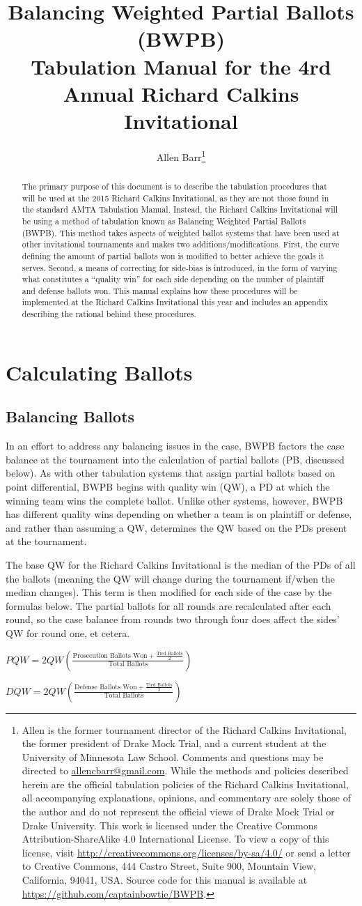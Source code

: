 \documentclass{article}
\title{\textbf{Balancing Weighted Partial Ballots (BWPB)}\\ \large  Tabulation Manual for the 4rd Annual Richard Calkins Invitational}
\author{Allen Barr\footnote{Allen is the former tournament director of the Richard Calkins Invitational, the former president of Drake Mock Trial, and a current student at the University of Minnesota Law School.  Comments and questions may be directed to \href{mailto:allencbarr@gmail.com}{allencbarr@gmail.com}.  While the methods and policies described herein are the official tabulation policies of the Richard Calkins Invitational, all accompanying explanations, opinions, and commentary are solely those of the author and do not represent the official views of Drake Mock Trial  or Drake University.  This work is licensed under the Creative Commons Attribution-ShareAlike 4.0 International License. To view a copy of this license, visit \url{http://creativecommons.org/licenses/by-sa/4.0/} or send a letter to Creative Commons, 444 Castro Street, Suite 900, Mountain View, California, 94041, USA. Source code for this manual is available at \url{https://github.com/captainbowtie/BWPB}.}}
\begin{document}
\maketitle
\begin{abstract}
The primary purpose of this document is to describe the tabulation procedures that will be used at the 2015 Richard Calkins Invitational, as they are not those found in the standard AMTA Tabulation Manual.  Instead, the Richard Calkins Invitational will be using a method of tabulation known as Balancing Weighted Partial Ballots (BWPB).  This method takes aspects of weighted ballot systems that have been used at other invitational tournaments and makes two additions/modifications.  First, the curve defining the amount of partial ballots won is modified to better achieve the goals it serves.  Second, a means of correcting for side-bias is introduced, in the form of varying what constitutes a ``quality win'' for each side depending on the number of plaintiff and defense ballots won.  This manual explains how these procedures will be implemented at the Richard Calkins Invitational this year and includes an appendix describing the rational behind these procedures.
\end{abstract}
\section{Calculating Ballots}
\subsection{Balancing Ballots}
In an effort to address any balancing issues in the case, BWPB factors the case balance at the tournament into the calculation of partial ballots (PB, discussed below). As with other tabulation systems that assign partial ballots based on point differential, BWPB begins with quality win (QW), a PD at which the winning team wins the complete ballot. Unlike other systems, however, BWPB has different quality wins depending on whether a team is on plaintiff or defense, and rather than assuming a QW, determines the QW based on the PDs present at the tournament.

The base QW for the Richard Calkins Invitational is the median of the PDs of all the ballots (meaning the QW will change during the tournament if/when the median changes). This term is then modified for each side of the case by the formulas below. The partial ballots for all rounds are recalculated after each round, so the case balance from rounds two through four does affect the sides' QW for round one, et cetera.
\begin{center}
$PQW=2QW\left(\frac{\mbox{Prosecution Ballots Won}+\frac{\mbox{Tied Ballots}}{2}}{\mbox{Total Ballots}}\right)$

$DQW=2QW\left(\frac{\mbox{Defense Ballots Won}+\frac{\mbox{Tied Ballots}}{2}}{\mbox{Total Ballots}}\right)$
\end{center}
\end{document}
